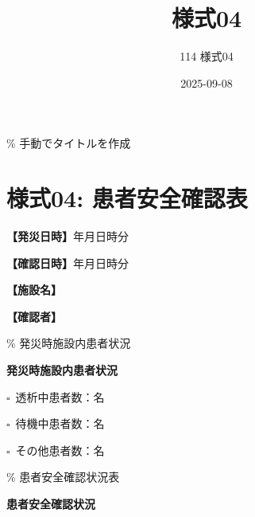\documentclass[
  japanese,
]{jarticle}
\title{様式04}
\subtitle{114 様式04}
\author{}
\date{2025-09-08}
\newcommand{\checkbox}{$\square$\ }
\newcommand{\underlinespace}[1]{\underline{\hspace{#1}}}
\begin{document}
\maketitle


\% 手動でタイトルを作成

\section{様式04:
患者安全確認表}\label{ux69d8ux5f0f04-ux60a3ux8005ux5b89ux5168ux78baux8a8dux8868}

\textbf{【発災日時】}\underlinespace{2cm}年\underlinespace{1cm}月\underlinespace{1cm}日\underlinespace{1cm}時\underlinespace{1cm}分

\textbf{【確認日時】}\underlinespace{2cm}年\underlinespace{1cm}月\underlinespace{1cm}日\underlinespace{1cm}時\underlinespace{1cm}分

\textbf{【施設名】} \underlinespace{10cm}

\textbf{【確認者】} \underlinespace{10cm}

\% 発災時施設内患者状況

\textbf{\large 発災時施設内患者状況}

\checkbox 透析中患者数：\underlinespace{2cm}名

\checkbox 待機中患者数：\underlinespace{2cm}名

\checkbox その他患者数：\underlinespace{2cm}名

\% 患者安全確認状況表

\textbf{\large 患者安全確認状況}
\end{document}
